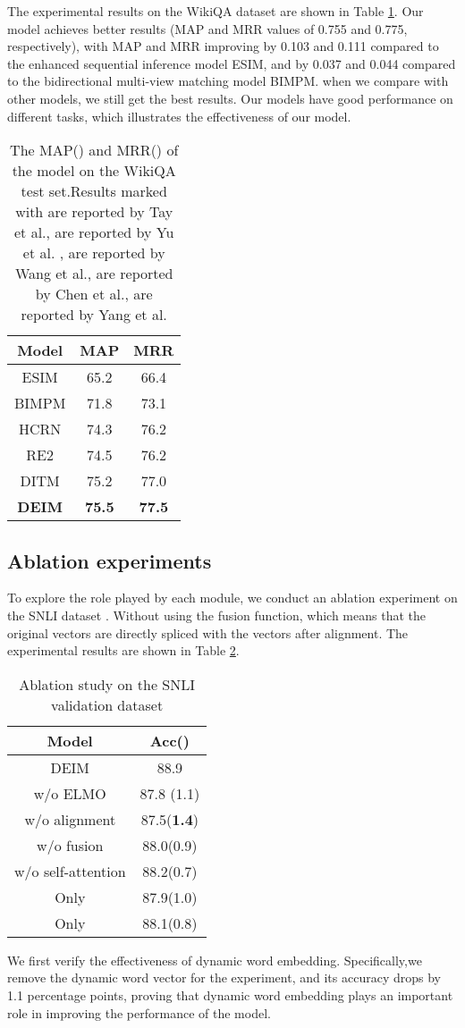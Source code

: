 \documentclass[review]{elsarticle}
\begin{document}
The experimental results on the WikiQA dataset are shown in Table \ref{tab:6}. Our model achieves better results (MAP and MRR values of 0.755 and 0.775, respectively), with MAP and MRR improving by 0.103 and 0.111 compared to the enhanced sequential inference model ESIM, and by 0.037 and 0.044 compared to the bidirectional multi-view matching model BIMPM. when we compare with other models, we still get the best results. Our models have good performance on different tasks, which illustrates the effectiveness of our model.
\begin{table}[htbp]
 \centering
  \caption{\label{tab:6}The MAP() and MRR() of the model on the WikiQA test set.Results marked with     are reported by Tay et al.\cite{tay2018hermitian},  are reported by Yu et al.\cite{yu2021simple} ,  are reported by Wang et al.\cite{wang2017bilateral},   are reported by Chen et al.\cite{chen2017enhanced},  are reported by Yang et al.\cite{yang2019simple}}
\begin{tabular}{ccc}
 \toprule
Model & MAP & MRR\\
 \midrule

ESIM & 65.2 & 66.4 \\
BIMPM & 71.8 & 73.1 \\
HCRN & 74.3 & 76.2 \\
RE2 & 74.5 & 76.2 \\
DITM & 75.2 & 77.0 \\
\textbf{DEIM} & \textbf{75.5}&  \textbf{77.5} \\
\bottomrule
 \end{tabular}
\end{table}
\subsection{ Ablation experiments}
To explore the role played by each module, we conduct an ablation experiment  on the SNLI dataset . Without using the fusion function, which means that the original vectors are directly spliced with the vectors after alignment. The experimental results are shown in Table \ref{tab:7}.
\begin{table}
 \centering
  \caption{\label{tab:7}Ablation study  on the SNLI validation dataset}
\begin{tabular}{cc}
 \toprule
Model & Acc()\\
 \midrule
DEIM & 88.9 \\
w/o ELMO & 87.8 (1.1)\\
w/o alignment & 87.5(\textbf{1.4}) \\
w/o fusion & 88.0(0.9) \\
w/o self-attention & 88.2(0.7) \\
Only  & 87.9(1.0) \\
Only  & 88.1(0.8) \\
\bottomrule
 \end{tabular}
\end{table}
We first verify the effectiveness of dynamic word embedding. Specifically,we remove the dynamic word vector for the experiment, and its accuracy drops by 1.1 percentage points, proving that dynamic word embedding plays an important role in improving the performance of the model.
\end{document}
